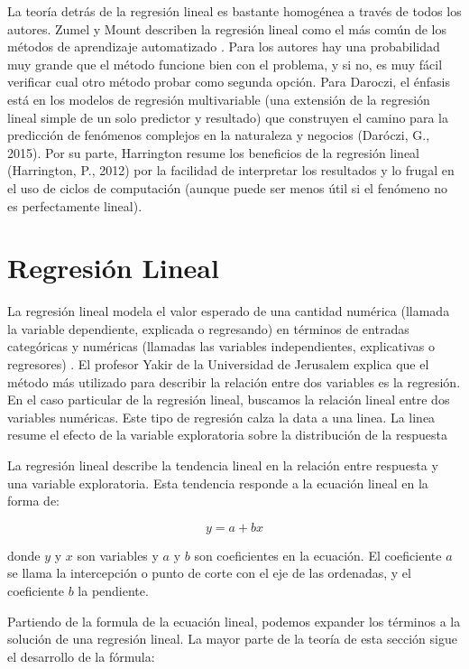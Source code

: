 \documentclass[letterpaper, spanish, 11pt]{report}
\begin{document}
La teoría detrás de la regresión lineal es bastante homogénea a través de todos los autores. Zumel y Mount describen la regresión lineal como el más común de los métodos de aprendizaje automatizado \cite{zumelMount}. Para los autores hay una probabilidad muy grande que el método funcione bien con el problema, y si no, es muy fácil verificar cual otro método probar como segunda opción. Para Daroczi, el énfasis está en los modelos de regresión multivariable (una extensión de la regresión lineal simple de un solo predictor y resultado) que construyen el camino para la predicción de fenómenos complejos en la naturaleza y negocios (Daróczi, G., 2015). Por su parte, Harrington resume los beneficios de la regresión lineal (Harrington, P., 2012) por la facilidad de interpretar los resultados y lo frugal en el uso de ciclos de computación (aunque puede ser menos útil si el fenómeno no es perfectamente lineal).

\section{Regresión Lineal}
La regresión lineal modela el valor esperado de una cantidad numérica (llamada la variable dependiente, explicada o regresando) en términos de entradas categóricas y numéricas (llamadas las variables independientes, explicativas o regresores) \cite{zumelMount}. El profesor Yakir de la Universidad de Jerusalem explica que el método más utilizado para describir la relación entre dos variables es la regresión. En el caso particular de la regresión lineal, buscamos la relación lineal entre dos variables numéricas. Este tipo de regresión calza la data a una linea. La linea resume el efecto de la variable exploratoria sobre la distribución de la respuesta \cite{yakir}

La regresión lineal describe la tendencia lineal en la relación entre respuesta y una variable exploratoria. Esta tendencia responde a la ecuación lineal en la forma de:

\[ y = a + bx\]

donde \(y\) y \(x\) son variables y \(a\) y \(b\) son coeficientes en la ecuación. El coeficiente \(a\) se llama la intercepción o punto de corte con el eje de las ordenadas, y el coeficiente \(b\) la pendiente.

Partiendo de la formula de la ecuación lineal, podemos expander los términos a la solución de una regresión lineal. La mayor parte de la teoría de esta sección sigue el desarrollo de la fórmula:
\end{document}
